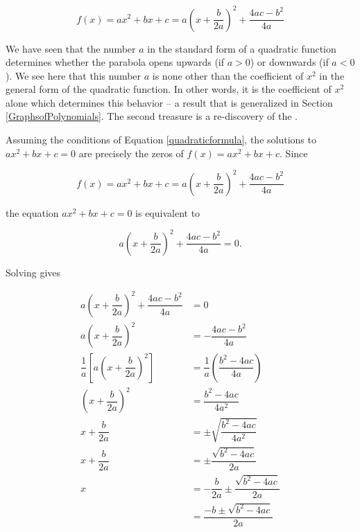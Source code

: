 \[ f(x) = ax^2 + bx + c =  a\left(x+\dfrac{b}{2a}\right)^2 + \dfrac{4ac - b^2}{4a}\]


We have seen that the number $a$ in the standard form of a quadratic function determines whether the parabola opens upwards (if $a>0$) or downwards (if $a < 0$).  We see here that this number $a$ is none other than the coefficient of $x^2$ in the general form of the quadratic function.  In other words, it is the coefficient of $x^2$ alone which determines this behavior -- a result that is generalized in Section \ref{GraphsofPolynomials}.  The second treasure is a re-discovery of the  .

\smallskip


\smallskip

Assuming the conditions of Equation \ref{quadraticformula}, the solutions to $ax^2+bx+c = 0$ are precisely the zeros of $f(x) = ax^2 + bx + c$. Since

\[ f(x) = ax^2+bx+c = a\left(x+\dfrac{b}{2a}\right)^2 + \dfrac{4ac - b^2}{4a}\]

the equation $ax^2 + bx + c = 0$ is equivalent to

\[a\left(x+\dfrac{b}{2a}\right)^2 + \dfrac{4ac - b^2}{4a} = 0.\]

Solving gives 

\begin{align*}
 a\left(x+\dfrac{b}{2a}\right)^2 + \dfrac{4ac - b^2}{4a} & =  0  \\ 
  a\left(x+\dfrac{b}{2a}\right)^2  & =  - \dfrac{4ac - b^2}{4a}  \\[3pt]
  \dfrac{1}{a} \left[a\left(x+\dfrac{b}{2a}\right)^2\right] & =  \dfrac{1}{a} \left(\dfrac{b^2-4ac}{4a}\right)  \\[3pt]
 \left(x+\dfrac{b}{2a}\right)^2 & =  \dfrac{b^2-4ac}{4a^2} \\[3pt]
  x+\dfrac{b}{2a} & =  \pm \sqrt{\dfrac{b^2-4ac}{4a^2}}  \tag*{extract square roots} \\[3pt]
  x+\dfrac{b}{2a} & =  \pm \dfrac{\sqrt{b^2-4ac}}{2a}  \\[3pt]
  x & =  -\dfrac{b}{2a} \pm \dfrac{\sqrt{b^2-4ac}}{2a} \\[3pt]
    & =  \dfrac{-b \pm \sqrt{b^2-4ac}}{2a}
\end{align*}

